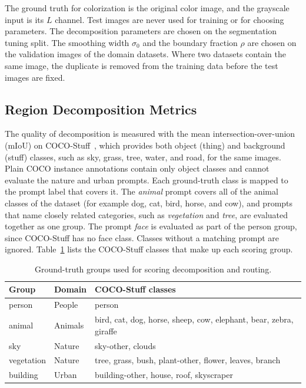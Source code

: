 \documentclass{FastFyp}
\begin{document}
The ground truth for colorization is the original color image, and the grayscale input is its $L$ channel. Test images are never used for training or for choosing parameters. The decomposition parameters are chosen on the segmentation tuning split. The smoothing width $\sigma_0$ and the boundary fraction $\rho$ are chosen on the validation images of the domain datasets. Where two datasets contain the same image, the duplicate is removed from the training data before the test images are fixed.

\subsection{Region Decomposition Metrics}

The quality of decomposition is measured with the mean intersection-over-union (mIoU) on COCO-Stuff~\cite{caesar2018cocostuff}, which provides both object (thing) and background (stuff) classes, such as sky, grass, tree, water, and road, for the same images. Plain COCO instance annotations contain only object classes and cannot evaluate the nature and urban prompts. Each ground-truth class is mapped to the prompt label that covers it. The \textit{animal} prompt covers all of the animal classes of the dataset (for example dog, cat, bird, horse, and cow), and prompts that name closely related categories, such as \textit{vegetation} and \textit{tree}, are evaluated together as one group. The prompt \textit{face} is evaluated as part of the person group, since COCO-Stuff has no face class. Classes without a matching prompt are ignored. Table~\ref{tab:a_groups} lists the COCO-Stuff classes that make up each scoring group.

\begin{table}[htbp]
\centering
\caption{Ground-truth groups used for scoring decomposition and routing.}
\label{tab:a_groups}
\begin{tabular}{|l|l|p{7.5cm}|}
\hline
\textbf{Group} & \textbf{Domain} & \textbf{COCO-Stuff classes} \\ \hline
person & People & person \\ \hline
animal & Animals & bird, cat, dog, horse, sheep, cow, elephant, bear, zebra, giraffe \\ \hline
sky & Nature & sky-other, clouds \\ \hline
vegetation & Nature & tree, grass, bush, plant-other, flower, leaves, branch \\ \hline
building & Urban & building-other, house, roof, skyscraper \\ \hline
\end{tabular}
\end{table}
\end{document}
